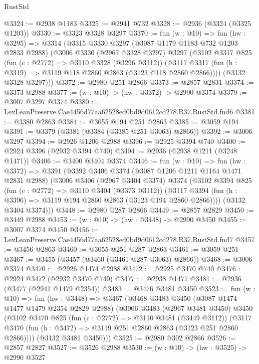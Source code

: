 \begin{lexlean}{RustStd}
\begin{coremodule}
@3324 := @2938 @1183
@3325 := @2941 @732
@3328 := @2936 (@3324 (@3325 @1203))
@3330 := @3323 @3328 @3297
@3370 := fun (w : @10) =>
  fun (hw : @3295) =>
  @3314
    (@3315
      @3330
      @3297
      (@3087 @1179 @1183 @732 @1203 @2833 @2988)
      (@3006
        @3330
        (@2967 @3328 @3297)
        @3297
        (@3102
          @3317
          @825
          (fun (c : @2772) => @3110 @3328 (@3296 @3112))
          (@3117 @3317 (fun (h : @3319) => @3119 @118 @2860 @2863 (@3123 @118 @2860 @2866))))
        (@3132 @3328 @3297)))
@3372 := @2980 @251 @2866
@3373 := @2857 @2831
@3374 := @3373 @2988
@3377 := (w : @10) -> (hw : @3372) -> @2990 @3374
@3379 := @3007 @3297 @3374
@3380 := LexLeanPreserve.Cae4456d77aa62528ed0bd9d0612cd278.R37.RustStd.fnd6
@3381 := @3380 @2863
@3384 := @3055 @194 @251 @2863
@3385 := @3059 @194
@3391 := @3379 (@3381 (@3384 (@3385 @251 @3063) @2866))
@3392 := @3006 @3297
@3394 := @2926 @1206 @2988
@3396 := @2925 @3394 @740
@3400 := @2924 @3396 (@2932 @3394 @740)
@3404 := @2936 (@2938 @1211 (@3248 @1471))
@3406 := @3400 @3404 @3374
@3446 := fun (w : @10) =>
  fun (hw : @3372) =>
  @3391
    (@3392
      @3406
      @3374
      (@3087 @1206 @1211 @1164 @1471 @2831 @2988)
      (@3006
        @3406
        (@2967 @3404 @3374)
        @3374
        (@3102
          @3394
          @825
          (fun (c : @2772) => @3110 @3404 (@3373 @3112))
          (@3117 @3394 (fun (h : @3396) => @3119 @194 @2860 @2863 (@3123 @194 @2860 @2866))))
        (@3132 @3404 @3374)))
@3448 := @2980 @287 @2866
@3449 := @2857 @2829
@3450 := @3449 @2988
@3453 := (w : @10) -> (hw : @3448) -> @2990 @3450
@3455 := @3007 @3374 @3450
@3456 := LexLeanPreserve.Cae4456d77aa62528ed0bd9d0612cd278.R37.RustStd.fnd7
@3457 := @3456 @2863
@3460 := @3055 @251 @287 @2863
@3461 := @3059 @251
@3467 := @3455 (@3457 (@3460 (@3461 @287 @3063) @2866))
@3468 := @3006 @3374
@3470 := @2926 @1474 @2988
@3472 := @2925 @3470 @740
@3476 := @2924 @3472 (@2932 @3470 @740)
@3477 := @2938 @1477
@3481 := @2936 (@3477 (@2941 @1479 @2354))
@3483 := @3476 @3481 @3450
@3523 := fun (w : @10) =>
  fun (hw : @3448) =>
  @3467
    (@3468
      @3483
      @3450
      (@3087 @1474 @1477 @1479 @2354 @2829 @2988)
      (@3006
        @3483
        (@2967 @3481 @3450)
        @3450
        (@3102
          @3470
          @825
          (fun (c : @2772) => @3110 @3481 (@3449 @3112))
          (@3117 @3470 (fun (h : @3472) => @3119 @251 @2860 @2863 (@3123 @251 @2860 @2866))))
        (@3132 @3481 @3450)))
@3525 := @2980 @302 @2866
@3526 := @2857 @2827
@3527 := @3526 @2988
@3530 := (w : @10) -> (hw : @3525) -> @2990 @3527

\end{coremodule}
\end{lexlean}
